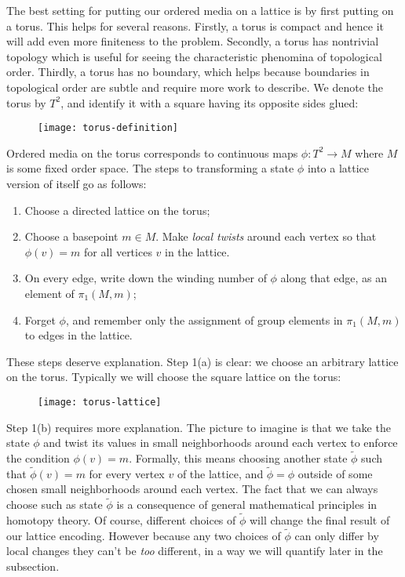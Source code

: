 The best setting for putting our ordered media on a lattice is by first putting on a torus. This helps for several reasons. Firstly, a torus is compact and hence it will add even more finiteness to the problem. Secondly, a torus has nontrivial topology which is useful for seeing the characteristic phenomina of topological order. Thirdly, a torus has no boundary, which helps because boundaries in topological order are subtle and require more work to describe. We denote the torus by $T^2$, and identify it with a square having its opposite sides glued:

\begin{figure}[h]
\begin{center}
\texttt{[image: torus-definition]}
\end{center}
\end{figure}

Ordered media on the torus corresponds to continuous maps $\phi: T^2\to M$ where $M$ is some fixed order space. The steps to transforming a state $\phi$ into a lattice version of itself go as follows:

\begin{enumerate}
\item Choose a directed lattice on the torus;
\item Choose a basepoint $m\in M$. Make \textit{local twists} around each vertex so that $\phi(v)=m$ for all vertices $v$ in the lattice.
\item On every edge, write down the winding number of $\phi$ along that edge, as an element of $\pi_1(M,m)$;
\item Forget $\phi$, and remember only the assignment of group elements in $\pi_1(M,m)$ to edges in the lattice.
\end{enumerate}

These steps deserve explanation. Step 1(a) is clear: we choose an arbitrary lattice on the torus. Typically we will choose the square lattice on the torus:

\begin{figure}[h]
\begin{center}
\texttt{[image: torus-lattice]}
\end{center}
\end{figure}

Step 1(b) requires more explanation. The picture to imagine is that we take the state $\phi$ and twist its values in small neighborhoods around each vertex to enforce the condition $\phi(v)=m$. Formally, this means choosing another state $\tilde{\phi}$ such that $\tilde{\phi}(v)=m$ for every vertex $v$ of the lattice, and $\tilde{\phi}=\phi$ outside of some chosen small neighborhoods around each vertex. The fact that we can always choose such as state $\tilde{\phi}$ is a consequence of general mathematical principles in homotopy theory. Of course, different choices of $\tilde{\phi}$ will change the final result of our lattice encoding. However because any two choices of $\tilde{\phi}$ can only differ by local changes they can't be \textit{too} different, in a way we will quantify later in the subsection.

